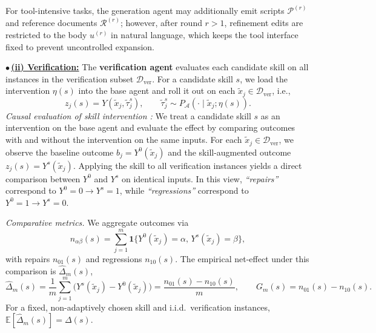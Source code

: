 \documentclass{article}
\begin{document}
For tool-intensive tasks, the generation agent may additionally emit scripts $\mathcal{P}^{(r)}$ and reference documents $\mathcal{R}^{(r)}$; however, after round $r > 1$, refinement edits are restricted to the body $u^{(r)}$ in natural language, which keeps the tool interface fixed to prevent uncontrolled expansion.

$\bullet$\,\underline{\textbf{(ii) Verification:}} The \textbf{verification agent} evaluates each candidate skill on all instances in the verification subset $\mathcal{D}_{\mathrm{ver}}$.
For a candidate skill $s$, we load the intervention $\eta(s)$ into the base agent and roll it out on each $\tilde{x}_j\in\mathcal{D}_{\mathrm{ver}}$, i.e.,
\begin{equation}
    z_j(s)=Y(\tilde{x}_j,\tilde{\tau}^{s}_{j}),
    \qquad
    \tilde{\tau}^{s}_{j}\sim P_{\mathcal{A}}(\cdot\mid \tilde{x}_j;\eta(s)).
\end{equation}
\emph{Causal evaluation of skill intervention :}
We treat a candidate skill $s$ as an intervention on the base agent and evaluate the effect by comparing outcomes with and without the intervention on the same inputs.
For each $\tilde{x}_j\in\mathcal{D}_{\mathrm{ver}}$, we observe the baseline outcome $b_j = Y^{0}(\tilde{x}_j)$ and the skill-augmented outcome $z_j(s)=Y^{s}(\tilde{x}_j)$.
Applying the skill to all verification instances yields a direct comparison between $Y^{0}$ and $Y^{s}$ on identical inputs.
In this view, \emph{``repairs''} correspond to $Y^{0}=0 \rightarrow Y^{s}=1$, while \emph{``regressions''} correspond to $Y^{0}=1 \rightarrow Y^{s}=0$.

\emph{Comparative metrics.}
We aggregate outcomes via
\begin{equation}
    n_{\alpha\beta}(s)=\sum_{j=1}^{m}\mathbf{1}\{Y^{0}(\tilde{x}_j)=\alpha,\,Y^{s}(\tilde{x}_j)=\beta\},
\end{equation}
with repairs $n_{01}(s)$ and regressions $n_{10}(s)$.
The empirical net-effect under this comparison is $\widehat{\Delta}_m(s)$,
\begin{equation}
\label{eq:netgain}
    \widehat{\Delta}_m(s)
    =\frac{1}{m}\sum_{j=1}^{m}\big(Y^{s}(\tilde{x}_j)-Y^{0}(\tilde{x}_j)\big)
    =\frac{n_{01}(s)-n_{10}(s)}{m},
    \qquad
    G_m(s)=n_{01}(s)-n_{10}(s).
\end{equation}
For a fixed, non-adaptively chosen skill and i.i.d.\ verification instances,
$\mathbb{E}[\widehat{\Delta}_m(s)]=\Delta(s)$.
\end{document}
